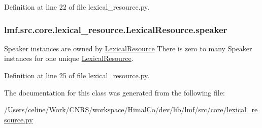 Definition at line 22 of file lexical\+\_\+resource.\+py.

\hypertarget{classlmf_1_1src_1_1core_1_1lexical__resource_1_1_lexical_resource_a378c5ca2854f818361547eee196d3497}{
\subsubsection[{speaker}]{\setlength{\rightskip}{0pt plus 5cm}lmf.\+src.\+core.\+lexical\+\_\+resource.\+Lexical\+Resource.\+speaker}}\label{classlmf_1_1src_1_1core_1_1lexical__resource_1_1_lexical_resource_a378c5ca2854f818361547eee196d3497}


Speaker instances are owned by \hyperlink{classlmf_1_1src_1_1core_1_1lexical__resource_1_1_lexical_resource}{Lexical\+Resource} There is zero to many Speaker instances for one unique \hyperlink{classlmf_1_1src_1_1core_1_1lexical__resource_1_1_lexical_resource}{Lexical\+Resource}. 



Definition at line 25 of file lexical\+\_\+resource.\+py.



The documentation for this class was generated from the following file\+:\begin{DoxyCompactItemize}
\item 
/\+Users/celine/\+Work/\+C\+N\+R\+S/workspace/\+Himal\+Co/dev/lib/lmf/src/core/\hyperlink{lexical__resource_8py}{lexical\+\_\+resource.\+py}\end{DoxyCompactItemize}
